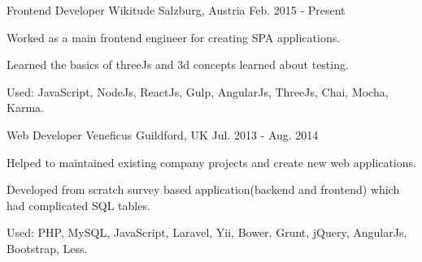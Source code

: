 

\begin{cventries}

  \cventry
    {Frontend Developer} %
    {Wikitude} %
    {Salzburg, Austria} %
    {Feb. 2015 - Present} %
    {
      \begin{cvitems} %
        \item {Worked as a main frontend engineer for creating SPA applications.}
        \item {Learned the basics of threeJs and 3d concepts learned about testing.}
        \item {Used: JavaScript, NodeJs, ReactJs, Gulp, AngularJs, ThreeJs, Chai, Mocha, Karma.}
      \end{cvitems}
    }

  \cventry
    {Web Developer} %
    {Veneficus} %
    {Guildford, UK} %
    {Jul. 2013 - Aug. 2014} %
    {
      \begin{cvitems} %
        \item {Helped to maintained existing company projects and create new web applications.}
        \item {Developed from scratch survey based application(backend and frontend) which had complicated SQL tables.}
        \item {Used: PHP, MySQL, JavaScript, Laravel, Yii, Bower, Grunt, jQuery, AngularJs, Bootstrap, Less.}
      \end{cvitems}
    }

\end{cventries}
